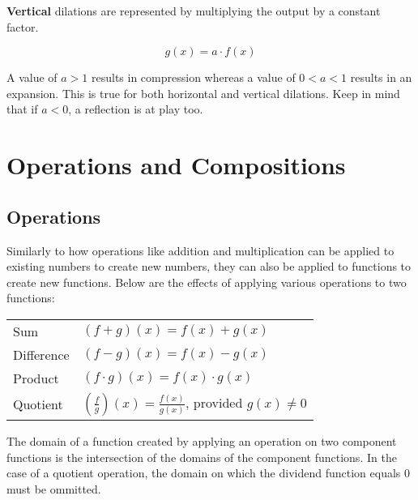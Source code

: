 \documentclass{article}
\begin{document}
\begin{center}
\end{center}

\textbf{Vertical} dilations are represented by multiplying the output by a constant factor.

\begin{equation*}
    g(x) = a\cdot f(x)
\end{equation*}

\begin{center}
\end{center}

A value of $a > 1$ results in compression whereas a value of $0 < a < 1$ results in an expansion. This is true for both horizontal and vertical dilations. Keep in mind that if $a < 0$, a reflection is at play too.

\section{Operations and Compositions}

\subsection{Operations}
Similarly to how operations like addition and multiplication can be applied to existing numbers to create new numbers, they can also be applied to functions to create new functions. Below are the effects of applying various operations to two functions:
\renewcommand{\arraystretch}{1.25}
\begin{table}[H]
    \centering
    \begin{tabular}{p{2cm} p{10cm}}
    Sum & $(f+g)(x) = f(x) + g(x)$ \\
    Difference & $(f-g)(x) = f(x) - g(x)$ \\
    Product & $(f \cdot g)(x) = f(x) \cdot g(x)$ \\
    Quotient & $(\frac{f}{g})(x) = \frac{f(x)}{g(x)}$, provided $g(x)\neq0$\\
    \end{tabular}
\end{table}
\renewcommand{\arraystretch}{1}
The domain of a function created by applying an operation on two component functions is the intersection of the domains of the component functions. In the case of a quotient operation, the domain on which the dividend function equals 0 must be ommitted. 
\end{document}
